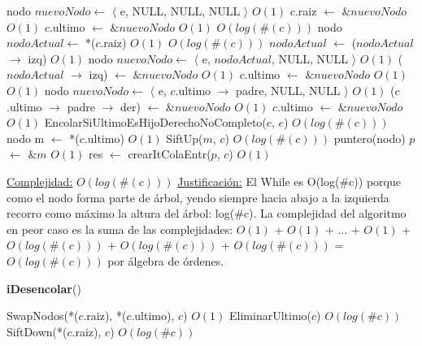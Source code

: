 \begin{Algoritmos}
\begin{algorithmic}[1]
        \State nodo $nuevoNodo \gets$ $\langle$ e, NULL, NULL, NULL $\rangle$   \Comment $O(1)$
        \State $c$.raiz $\gets$ $\& nuevoNodo$ \Comment $O(1)$
        \State $c$.ultimo $\gets$ $\& nuevoNodo$ \Comment $O(1)$
    \Else
          \Comment $O(log(\#(c)))$
            \State nodo $nodoActual \gets$ $*$($c$.raiz) \Comment $O(1)$
              \Comment $O(log(\#(c)))$
                \State $nodoActual$ $\gets$ ($nodoActual$ $\to$ izq)  \Comment $O(1)$
            \EndWhile
            \State nodo $nuevoNodo \gets$ $\langle$ e, $nodoActual$, NULL, NULL $\rangle$   \Comment $O(1)$
            \State ($nodoActual$ $\to$ izq) $\gets$ $\& nuevoNodo$ \Comment $O(1)$
            \State $c$.ultimo $\gets$ $\& nuevoNodo$ \Comment $O(1)$
        \Else
              \Comment $O(1)$
                \State nodo $nuevoNodo \gets$ $\langle$ e, $c$.ultimo $\to$ padre, NULL, NULL $\rangle$   \Comment $O(1)$
                \State ($c$.ultimo $\to$ padre $\to$ der) $\gets$ $\& nuevoNodo$ \Comment $O(1)$
                \State $c$.ultimo $\gets$ $\& nuevoNodo$ \Comment $O(1)$
            \Else %
                \State EncolarSiUltimoEsHijoDerechoNoCompleto($c$, $e$) \Comment $O(log(\#(c)))$
            \EndIf
        \EndIf
    \EndIf
    \State nodo m $\gets$ *($c$.ultimo) \Comment $O(1)$
    \State SiftUp($m$, $c$) \Comment $O(log(\#(c)))$
    \State puntero(nodo) $p$ $\gets$ $\&m$ \Comment $O(1)$
    \State res $\gets$ crearItColaEntr($p$, $c$) \Comment $O(1)$

    \medskip
    \Statex \underline{Complejidad:} $O(log(\#(c)))$
    \Statex \underline{Justificaci\'on:} El While es O(log($\#$c)) porque como el nodo forma parte de \'arbol, yendo siempre hacia abajo a la izquierda recorro como m\'aximo la altura del \'arbol: log($\#$c). La complejidad del algoritmo en peor caso es la suma de las complejidades: $O(1)$ + $O(1)$ + ... + $O(1)$ + $O(log(\#(c)))$ + $O(log(\#(c)))$ + $O(log(\#(c)))$ = $O(log(\#(c)))$ por \'algebra de \'ordenes.
\end{algorithmic}


\begin{algorithm}[H]
{\textbf{iDesencolar}()}
\begin{algorithmic}[1]
    
    \State SwapNodos(*($c$.raiz), *($c$.ultimo), $c$) \Comment $O(1)$
    \State EliminarUltimo($c$) \Comment $O(log(\#c))$
    \State SiftDown(*($c$.raiz), $c$) \Comment $O(log(\#c))$
    

\end{algorithmic}
\end{algorithm}
\end{Algoritmos}
